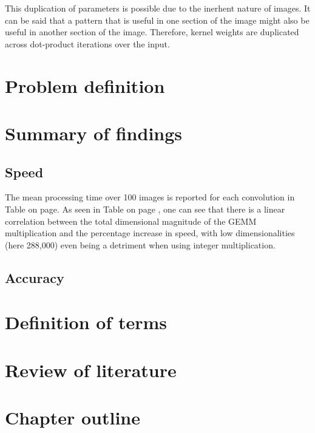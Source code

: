 This duplication of parameters is possible due to the inerhent nature of images. It can be said that a pattern that is useful in one section of the image might also be useful in another section of the image. Therefore, kernel weights are duplicated across dot-product iterations over the input.

\section{Problem definition}
\section{Summary of findings}
\subsection{Speed}

The mean processing time over 100 images is reported for each convolution in Table on page. As seen in Table on page , one can see that there is a linear correlation between the total dimensional magnitude of the GEMM multiplication and the percentage increase in speed, with low dimensionalities (here 288,000) even being a detriment when using integer multiplication.

\subsection{Accuracy}

\section{Definition of terms}
\section{Review of literature}
\section{Chapter outline}